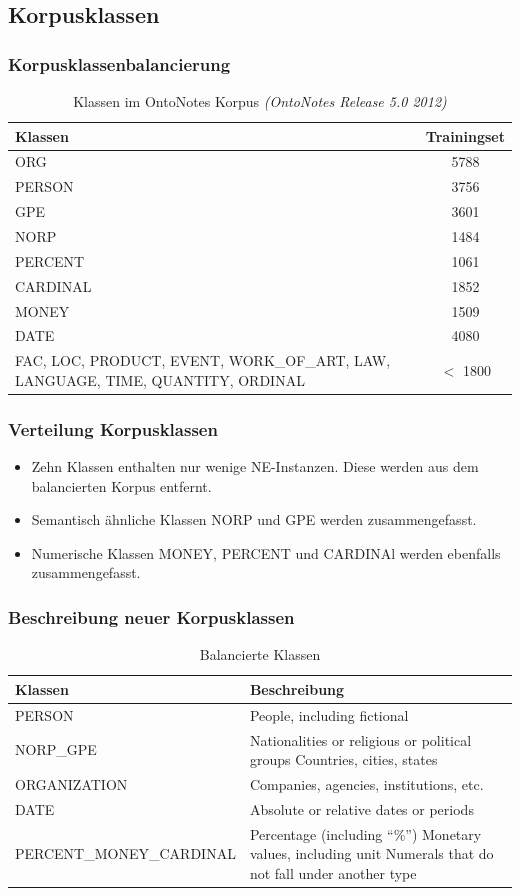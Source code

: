 \documentclass{beamer}
\begin{document}
	\subsection{Korpusklassen}
		\begin{frame}
			\frametitle{Korpusklassenbalancierung}
				\begin{table}
				\caption{Klassen im OntoNotes Korpus \textit{(OntoNotes Release 5.0 2012)}}
				\begin{tabularx}{\textwidth}{Xc}
					\toprule
					Klassen  & Trainingset \\
					\midrule
					ORG  & 5788 \\
					PERSON & 3756 \\
					GPE & 3601 \\
					NORP & 1484 \\
					PERCENT & 1061  \\
					CARDINAL & 1852 \\
					MONEY & 1509  \\
					DATE & 4080  \\
					FAC, LOC, PRODUCT, EVENT, WORK\_OF\_ART, LAW, LANGUAGE, TIME, QUANTITY, ORDINAL & $<$ 1800 \\
					\bottomrule
				\end{tabularx}
				\label{tab:datasets}
			\end{table}
		\end{frame}
			\begin{frame}
				\frametitle{Verteilung Korpusklassen}
				\begin{itemize}
					\item Zehn Klassen enthalten nur wenige NE-Instanzen. Diese werden aus dem balancierten Korpus entfernt.
					\item Semantisch ähnliche Klassen NORP und GPE werden zusammengefasst.
					\item Numerische Klassen MONEY, PERCENT und CARDINAl werden ebenfalls zusammengefasst.
				\end{itemize}
			\end{frame}
	\begin{frame}
		\frametitle{Beschreibung neuer Korpusklassen}
		\begin{table}
			\caption{Balancierte Klassen}
			\begin{tabularx}{\textwidth}{lX}
				\toprule
				Klassen  & Beschreibung \\
				\midrule
				PERSON 	& People, including fictional \\
				NORP\_GPE &	Nationalities or religious or political groups
				Countries, cities, states\\
				ORGANIZATION &	Companies, agencies, institutions, etc.\\
				DATE &	Absolute or relative dates or periods\\
				PERCENT\_MONEY\_CARDINAL &	Percentage (including “\%”)
				Monetary values, including unit
				Numerals that do not fall under another type \\
				\bottomrule
			\end{tabularx}
			\label{tab:datasets}
		\end{table}
	\end{frame}
\end{document}
